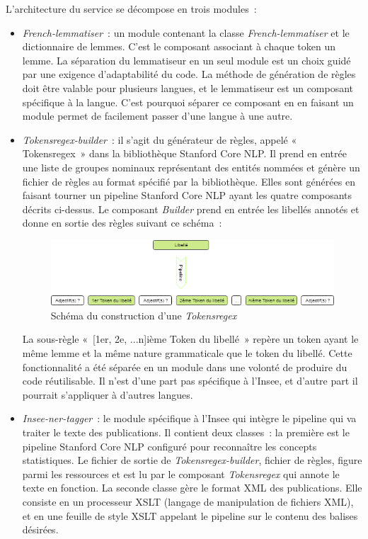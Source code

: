 L'architecture du service se décompose en trois modules~: 
\begin{itemize}
    \item \textit{French-lemmatiser}~: un module contenant la classe \textit{French-lemmatiser} et le dictionnaire de lemmes. C'est le composant associant à chaque token un lemme. La séparation du lemmatiseur en un seul module est un choix guidé par une exigence d'adaptabilité du code. La méthode de génération de règles doit être valable pour plusieurs langues, et le lemmatiseur est un composant spécifique à la langue. C'est pourquoi séparer ce composant en en faisant un module permet de facilement passer d'une langue à une autre.
    \vspace{5pt}
    \item \textit{Tokensregex-builder}~: il s'agit du générateur de règles, appelé «~ Tokensregex~» dans la bibliothèque Stanford Core NLP. Il prend en entrée une liste de groupes nominaux représentant des entités nommées et génère un fichier de règles au format spécifié par la bibliothèque. Elles sont générées en faisant tourner un pipeline Stanford Core NLP ayant les quatre composants décrits ci-dessus. Le composant \textit{Builder} prend en entrée les libellés annotés et donne en sortie des règles suivant ce schéma~: 
    \vspace{10pt}
    \begin{figure}[H]
        \centering
        \includegraphics[scale=0.6]{images/Exemple-tokensregex.png}
        \caption{Schéma du construction d'une \textit{Tokensregex}}
        \label{fig:schema-tokensregex}
    \end{figure}
    \vspace{10pt}
    La sous-règle «~[1er, 2e, ...n]ième Token du libellé~» repère un token ayant le même lemme et la même nature grammaticale que le token du libellé. Cette fonctionnalité a été séparée en un module dans une volonté de produire du code réutilisable. Il n'est d'une part pas spécifique à l'Insee, et d'autre part il pourrait s'appliquer à d'autres langues.
    \vspace{5pt}
    \item \textit{Insee-ner-tagger}~: le module spécifique à l'Insee qui intègre le pipeline qui va traiter le texte des publications. Il contient deux classes~: la première est le pipeline Stanford Core NLP configuré pour reconnaître les concepts statistiques. Le fichier de sortie de \textit{Tokensregex-builder}, fichier de règles, figure parmi les ressources et est lu par le composant \textit{Tokensregex} qui annote le texte en fonction. La seconde classe gère le format XML des publications. Elle consiste en un processeur XSLT (langage de manipulation de fichiers XML), et en une feuille de style XSLT appelant le pipeline sur le contenu des balises désirées.
    \newline
\end{itemize}

